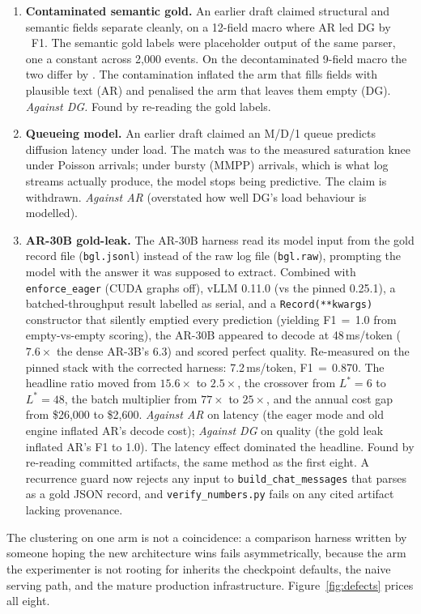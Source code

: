 \begin{enumerate}
recorded as a near-match was self-grading: our ``Drain'' was a regex fallback
instead of the reference implementation~\cite{drain}, and the gold generator
was the same code. The claim is withdrawn. \emph{Neutral} (inflated a third baseline, not
either architecture). Found by re-reading the gold-generation script. \item \textbf{Contaminated semantic gold.} An earlier draft claimed structural
and semantic fields separate cleanly, on a 12-field macro where AR led DG by
\twelveGap\ F1. The semantic gold labels were placeholder output of the same
parser, one a constant across 2{,}000 events. On the decontaminated 9-field
macro the two differ by \qualityGap. The contamination inflated the arm that
fills fields with plausible text (AR) and penalised the arm that leaves them
empty (DG). \emph{Against DG.} Found by re-reading the gold labels. \item \textbf{Queueing model.} An earlier draft claimed an M/D/1 queue
predicts diffusion latency under load. The match was to the measured
saturation knee under Poisson arrivals; under bursty (MMPP) arrivals, which is
what log streams actually produce, the model stops being predictive. The claim
is withdrawn. \emph{Against AR} (overstated how well DG's load behaviour is
modelled).
\item \textbf{AR-30B gold-leak.} The AR-30B harness read its model input
from the gold record file (\texttt{bgl.jsonl}) instead of the raw log
file (\texttt{bgl.raw}), prompting the model with the answer it was
supposed to extract. Combined with \texttt{enforce\_eager} (CUDA graphs
off), vLLM 0.11.0 (vs the pinned 0.25.1), a batched-throughput result
labelled as serial, and a \texttt{Record(**kwargs)} constructor that
silently emptied every prediction (yielding F1\,$=$\,1.0 from
empty-vs-empty scoring), the AR-30B appeared to decode at
48\,ms/token ($7.6\times$ the dense AR-3B's 6.3) and scored perfect
quality. Re-measured on the pinned stack with the corrected harness:
7.2\,ms/token, F1\,$=$\,0.870. The headline ratio moved from
$15.6\times$ to $2.5\times$, the crossover from $L^{*}\!=\!6$ to
$L^{*}\!=\!48$, the batch multiplier from $77\times$ to $25\times$, and
the annual cost gap from \$26{,}000 to \$2{,}600.
\emph{Against AR} on latency (the eager mode and old engine inflated
AR's decode cost); \emph{Against DG} on quality (the gold leak
inflated AR's F1 to 1.0). The latency effect dominated the headline.
Found by re-reading committed artifacts, the same method as the first
eight. A recurrence guard now rejects any input to
\texttt{build\_chat\_messages} that parses as a gold JSON record, and
\texttt{verify\_numbers.py} fails on any cited artifact lacking
provenance.
\end{enumerate} The clustering on one arm is not a coincidence: a comparison harness written by
someone hoping the new architecture wins fails asymmetrically, because the
arm the experimenter is not rooting for inherits the checkpoint defaults, the
naive serving path, and the mature production infrastructure.
Figure~\ref{fig:defects} prices all eight.

